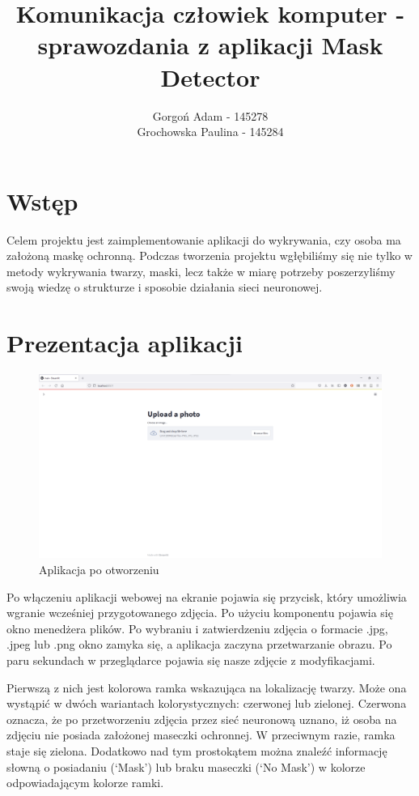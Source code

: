 \documentclass[12pt]{article}
\title{Komunikacja człowiek komputer - sprawozdania z aplikacji Mask Detector}
\author{Gorgoń Adam - 145278\\Grochowska Paulina - 145284}
\begin{document}
	\maketitle
	
	\section{Wstęp}
	Celem projektu jest zaimplementowanie aplikacji do wykrywania, czy osoba ma założoną maskę ochronną. Podczas tworzenia projektu wgłębiliśmy się nie tylko w metody wykrywania twarzy, maski, lecz także w miarę potrzeby poszerzyliśmy swoją wiedzę o strukturze i sposobie działania sieci neuronowej.
	\section{Prezentacja aplikacji}
	\begin{figure}
		\centering
		\includegraphics[width=\textwidth]{apka.png}
		\caption{Aplikacja po otworzeniu}
		\label{fig:apka}
	\end{figure}
	Po włączeniu aplikacji webowej na ekranie pojawia się przycisk, który umożliwia wgranie wcześniej przygotowanego zdjęcia. Po użyciu komponentu pojawia się okno menedżera plików. Po wybraniu i zatwierdzeniu zdjęcia o formacie .jpg, .jpeg lub .png okno zamyka się, a aplikacja zaczyna przetwarzanie obrazu. Po paru sekundach w przeglądarce pojawia się nasze zdjęcie z modyfikacjami.
	
	Pierwszą z nich jest kolorowa ramka wskazująca na lokalizację twarzy. Może ona wystąpić w dwóch wariantach kolorystycznych: czerwonej lub zielonej. Czerwona oznacza, że po przetworzeniu zdjęcia przez sieć neuronową uznano, iż osoba na zdjęciu nie posiada założonej maseczki ochronnej. W przeciwnym razie, ramka staje się zielona. Dodatkowo nad tym prostokątem można znaleźć informację słowną o posiadaniu (‘Mask’) lub braku maseczki (‘No Mask’) w kolorze odpowiadającym kolorze ramki.
	
\end{document}
